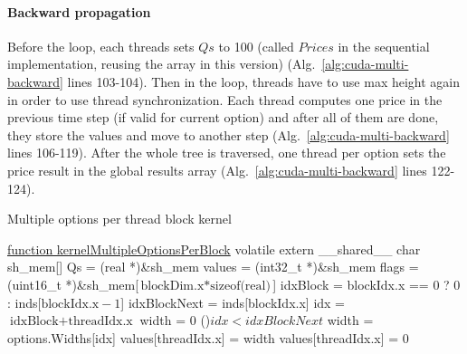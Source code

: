 \paragraph{Backward propagation}
Before the loop, each threads sets $\mathit{Qs}$ to 100 (called $\mathit{Prices}$ in the sequential implementation, reusing the array in this version) (Alg.~\ref{alg:cuda-multi-backward} lines 103-104). Then in the loop, threads have to use max height again in order to use thread synchronization. Each thread computes one price in the previous time step (if valid for current option) and after all of them are done, they store the values and move to another step (Alg.~\ref{alg:cuda-multi-backward} lines 106-119). After the whole tree is traversed, one thread per option sets the price result in the global results array (Alg.~\ref{alg:cuda-multi-backward} lines 122-124).

\newpage
\begin{algorithm}[H]
\DontPrintSemicolon
\caption{Multiple options per thread block kernel\label{alg:cuda-multi}}

\underline{function kernelMultipleOptionsPerBlock}\;
\;
volatile extern \_\_shared\_\_ char sh\_mem[]
Qs = (real *)\&sh\_mem
values = (int32\_t *)\&sh\_mem
flags = (uint16\_t *)\&sh\_mem[$\text{blockDim.x} * \text{sizeof(real)}$]
\;
idxBlock = blockIdx.x == 0 ? 0 : inds[$\text{blockIdx.x} - 1$]\;
idxBlockNext = inds[blockIdx.x]\;
idx = $\text{idxBlock} + \text{threadIdx.x}$\;
width = 0\; 
\eIf(){$\mathit{idx} < \mathit{idxBlockNext}$}
{
    width = options.Widths[idx]\;
    values[threadIdx.x] = width\;
}
{
    values[threadIdx.x] = 0\;
}
\Syncthreads\;
\end{algorithm}

